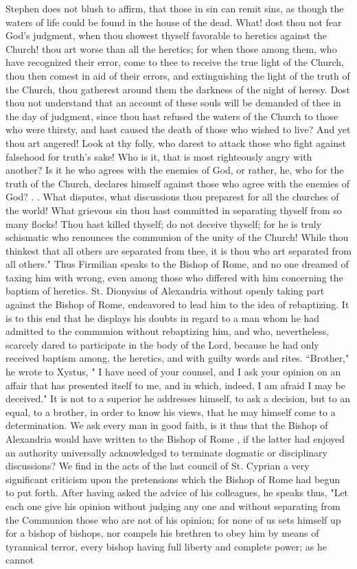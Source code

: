 Stephen does not blush to affirm, that those in sin can remit sins, as though the waters of life could be found in the house of the dead. What! dost thou not fear God's judgment, when thou showest thyself favorable to heretics against the Church! thou art worse than all the heretics; for when those among them, who have recognized their error, come to thee to receive the true light of the Church, thou then comest in aid of their errors, and extinguishing the light of the truth of the Church, thou gatherest around them the darkness of the night of heresy. Dost thou not understand that an account of these souls will be demanded of thee in the day of judgment, since thou hast refused the waters of the Church to those who were thirsty, and hast caused the death of those who wished to live? And yet thou art angered! Look at thy folly, who darest to attack those who fight against falsehood for truth's sake! Who is it, that is most righteously angry with another? Is it he who agrees with the enemies of God, or rather, he, who for the truth of the Church, declares himself against those who agree with the enemies of God? . . What disputes, what discussions thou preparest for all the churches of the world! What grievous sin thou hast committed in separating thyself from so many flocks! Thou hast killed thyself; do not deceive thyself; for he is truly schismatic who renounces the communion of the unity of the Church! While thou thinkest that all others are separated from thee, it is thou who art separated from all others." Thus Firmilian speaks to the Bishop of Rome, and no one dreamed of taxing him with wrong, even among those who differed with him concerning the baptism of heretics. St. Dionysius of Alexandria without openly taking part against the Bishop of Rome, endeavored to lead him to the idea of rebaptizing. It is to this end that he displays his doubts in regard to a man whom he had admitted to the communion without rebaptizing him, and who, nevertheless, scarcely dared to participate in the body of the Lord, because he had only received baptism among, the heretics, and with guilty words and rites. “Brother," he wrote to Xystus, " I have need of your counsel, and I ask your opinion on an affair that has presented itself to me, and in which, indeed, I am afraid I may be deceived." It is not to a superior he addresses himself, to ask a decision, but to an equal, to a brother, in order to know his views, that he may himself come to a determination. We ask every man in good faith, is it thus that the Bishop of Alexandria would have written to the Bishop of Rome , if the latter had enjoyed an authority universally acknowledged to terminate dogmatic or disciplinary discussions? We find in the acts of the last council of St. Cyprian a very significant criticism upon the pretensions which the Bishop of Rome had begun to put forth. After having asked the advice of his colleagues, he speaks thus, "Let each one give his opinion without judging any one and without separating from the Communion those who are not of his opinion; for none of us sets himself up for a bishop of bishops, nor compels his brethren to obey him by means of tyrannical terror, every bishop having full liberty and complete power; as he cannot

